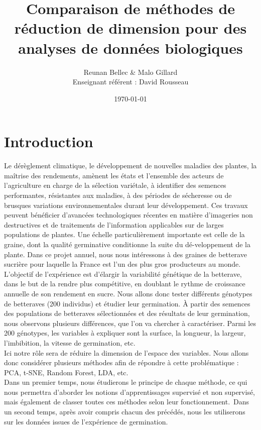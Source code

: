 \documentclass[12pt]{report}
\title{\textbf{Comparaison de méthodes de réduction de dimension pour des analyses de données biologiques}}
\author{Reunan Bellec \& Malo Gillard \\ Enseignant référent : David Rousseau}
\date{\today} %
\begin{document}
\maketitle

\tableofcontents

\thispagestyle{empty} %

\chapter*{Introduction}

Le dérèglement climatique, le développement de nouvelles maladies des plantes, la maîtrise des rendements, amènent les états et l’ensemble des acteurs de l’agriculture en charge de la sélection variétale, à identifier des semences performantes, résistantes aux maladies, à des périodes de sécheresse ou de brusques variations environnementales durant leur développement. Ces travaux peuvent bénéficier d’avancées technologiques récentes en matière d’imageries non destructives et de traitements de l’information applicables sur de larges populations de plantes. Une échelle particulièrement importante est celle de la graine, dont la qualité germinative conditionne la suite du dé-veloppement de la plante. Dans ce projet annuel, nous nous intéressons à des graines de betterave sucrière pour laquelle la France est l’un des plus gros producteurs au monde.\\


L'objectif de l'expérience est d'élargir la variabilité génétique de la betterave, dans le but de la rendre plus compétitive, en doublant le rythme de croissance annuelle de son rendement en sucre.
Nous allons donc tester différents génotypes de betteraves (200 individus) et étudier leur germination.
À partir des semences des populations de betteraves sélectionnées et des résultats de leur germination, nous observons plusieurs différences, que l'on va chercher à caractériser. Parmi les 200 génotypes, les variables à expliquer sont la surface, la longueur, la largeur, l'imbibition, la vitesse de germination, etc.\\

Ici notre rôle sera de réduire la dimension de l'espace des variables.
Nous allons donc considérer plusieurs méthodes afin de répondre à cette problématique : PCA, t-SNE, Random Forest, LDA, etc.\\

Dans un premier temps, nous étudierons le principe de chaque méthode, ce qui nous permettra d'aborder les notions d'apprentissages supervisé et non supervisé, mais également de classer toutes ces méthodes selon leur fonctionnement.\
Dans un second temps, après avoir compris chacun des précédés, nous les utiliserons sur les données issues de l'expérience de germination.
\end{document}
